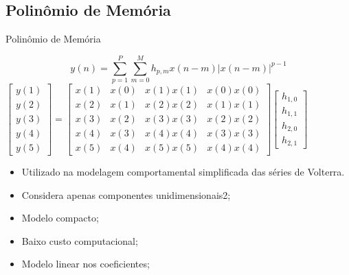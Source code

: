 \documentclass{if-beamer}
\begin{document}
\subsection{Polinômio de Memória}
\begin{frame}{Polinômio de Memória}
	\begin{minipage}{0.5\textwidth}
		\raggedleft
		\scriptsize
		\begin{equation}
			y(n) = \sum_{p=1}^{P} \sum_{m=0}^{M} h_{p,m} x(n-m) |x(n-m)|^{p-1}
		\end{equation}
			$
				\begin{bmatrix}
					y(1) \\
					y(2) \\
					y(3) \\
					y(4) \\
					y(5)
				\end{bmatrix}
				=
				\begin{bmatrix}
					x(1) & x(0) & x(1)x(1) & x(0)x(0) \\
					x(2) & x(1) & x(2)x(2) & x(1)x(1) \\
					x(3) & x(2) & x(3)x(3) & x(2)x(2) \\
					x(4) & x(3) & x(4)x(4) & x(3)x(3) \\
					x(5) & x(4) & x(5)x(5) & x(4)x(4)
				\end{bmatrix}
				\begin{bmatrix}
					h_{1,0} \\
					h_{1,1} \\
					h_{2,0} \\
					h_{2,1}
				\end{bmatrix}
			$
	
			
		
	\end{minipage}%
	\hspace{0.1\textwidth}
	\begin{minipage}{0.5\textwidth}
		\begin{itemize}
			\item Utilizado na modelagem comportamental simplificada das séries de Volterra.
			\item Considera apenas componentes unidimensionais2;
			\item Modelo compacto;
			\item Baixo custo computacional;
			\item Modelo linear nos coeficientes;
		\end{itemize}
	\end{minipage}
\end{frame}
\end{document}

